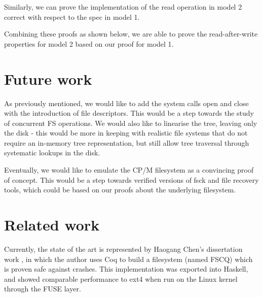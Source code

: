 \documentclass[format=sigconf,review=true]{acmart}
\begin{document}
Similarly, we can prove the implementation of the read operation in
model 2 correct with respect to the spec in model 1.


Combining these proofs as shown below, we are able to prove the read-after-write
properties for model 2 based on our proof for model 1.


\section{Future work}
As previously mentioned, we would like to add the system calls open and close with the
introduction of file descriptors. This would be a step towards the
study of concurrent FS operations. We would also like to linearise
the tree, leaving only the disk - this would be more in keeping
with realistic file systems that do not require an in-memory tree
representation, but still allow tree traversal through systematic
lookups in the disk.

Eventually, we would like to emulate the CP/M filesystem as a convincing proof
of concept. This would be a step towards verified versions of fsck
and file recovery tools, which could be based on our proofs about
the underlying filesystem.

\section{Related work}
Currently, the state of the art is represented by Haogang
Chen's dissertation work \cite{DBLP:conf/usenix/ChenZCCKZ16}, in which
the author uses Coq to build a filesystem (named FSCQ) which is proven
safe against crashes. This implementation was exported into Haskell,
and showed comparable performance to ext4 when run on the Linux kernel
through the FUSE layer.
\end{document}
